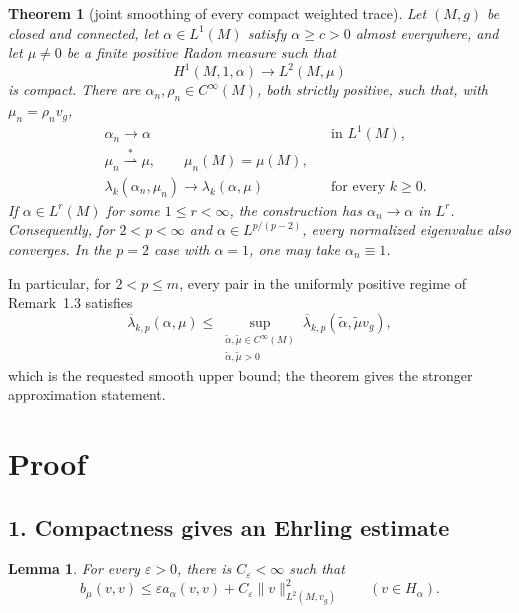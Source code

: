 \documentclass[11pt]{article}
\newtheorem{theorem}{Theorem}
\newtheorem{lemma}{Lemma}
\newcommand{\Ltwo}{L^2(M,v_g)}
\begin{document}
\begin{theorem}[joint smoothing of every compact weighted trace]
\label{thm:main}
Let \((M,g)\) be closed and connected, let
\(\alpha\in L^1(M)\) satisfy \(\alpha\geq c>0\) almost everywhere, and let
\(\mu\neq0\) be a finite positive Radon measure such that
\[
 H^1(M,1,\alpha)\longrightarrow L^2(M,\mu)
\]
is compact.  There are \(\alpha_n,\rho_n\in C^\infty(M)\), both strictly
positive, such that, with \(\mu_n=\rho_n v_g\),
\begin{align*}
 &\alpha_n\longrightarrow\alpha &&\text{in }L^1(M),\\
 &\mu_n\stackrel{*}{\rightharpoonup}\mu,
   \qquad \mu_n(M)=\mu(M),\\
 &\lambda_k(\alpha_n,\mu_n)\longrightarrow
   \lambda_k(\alpha,\mu) &&\text{for every }k\geq0.
\end{align*}
If \(\alpha\in L^r(M)\) for some \(1\leq r<\infty\), the construction has
\(\alpha_n\to\alpha\) in \(L^r\).  Consequently, for \(2<p<\infty\) and
\(\alpha\in L^{p/(p-2)}\), every normalized eigenvalue also converges.  In
the \(p=2\) case with \(\alpha=1\), one may take \(\alpha_n\equiv1\).
\end{theorem}

In particular, for \(2<p\leq m\), every pair in the uniformly positive
regime of Remark~1.3 satisfies
\[
 \overline\lambda_{k,p}(\alpha,\mu)
 \leq \sup_{\substack{\widetilde\alpha,\widetilde\mu\in C^\infty(M)\\
                 \widetilde\alpha,\widetilde\mu>0}}
       \overline\lambda_{k,p}(\widetilde\alpha,
                              \widetilde\mu v_g),
\]
which is the requested smooth upper bound; the theorem gives the stronger
approximation statement.

\section*{Proof}

\subsection*{1. Compactness gives an Ehrling estimate}

\begin{lemma}\label{lem:ehrling}
For every \(\varepsilon>0\), there is \(C_\varepsilon<\infty\) such that
\begin{equation}\label{eq:ehrling}
 b_\mu(v,v)\leq \varepsilon a_\alpha(v,v)
      +C_\varepsilon\|v\|_{\Ltwo}^2
 \qquad(v\in H_\alpha).
\end{equation}
\end{lemma}
\end{document}
